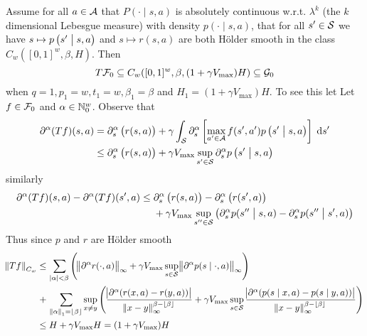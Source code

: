\begin{example}
  Assume for all $a \in \mathcal{A}$ that
  $P(\cdot \mid s,a)$ is absolutely continuous w.r.t. $\lambda^k$
  (the $k$ dimensional Lebesgue measure)
  with density $p(\cdot \mid s, a)$,
  that for all $s' \in \mathcal{S}$ we have
  $s \mapsto p\left(s' \;\middle\vert\; s, a \right)$
  and $s \mapsto r(s, a)$ are both Hölder smooth in the class
  $C_w([0,1]^w, \beta, H)$.
  Then
  \[ T \mathcal{F}_0 \subseteq C_w([0,1]^w, \beta, (1 + \gamma V_{\max}) H)
  \subseteq \mathcal{G}_0 \] 
  when $q=1, p_1 = w, t_1 = w, \beta_1 = \beta$ and $H_1 =
  (1 + \gamma V_{\max}) H$.
  To see this let
  Let $f \in \mathcal{F}_0$ and $\alpha \in \mathbb{N}_0^w$.
  Observe that
  \begin{align*}
    \partial^\alpha (Tf)(s, a)
    = & \; \partial^\alpha_s \left( r(s, a) \right)
    + \gamma \int_{\mathcal{S}}\partial^\alpha_s \left[ \max_{a' \in \mathcal{A}}
    f(s', a') p\left(s' \;\middle\vert\; s, a\right) \right] \; \mathrm{d} s' 
    \\ \leq & \; \partial^\alpha_s \left( r(s, a) \right)
    + \gamma V_{\max} \sup_{s' \in \mathcal{S}} \partial_s^\alpha
    p\left(s' \;\middle\vert\; s, a\right)
  \end{align*}
  similarly
  \begin{align*}
    \partial^\alpha (Tf)(s, a) - \partial^\alpha (Tf)(s', a)
    \leq & \; \partial^\alpha_s \left( r(s, a) \right)
    - \partial^\alpha_s \left( r(s', a) \right)
    \\ & \; + \gamma V_{\max} \sup_{s'' \in \mathcal{S}}
    \left( \partial_s^\alpha p(s'' \;\middle\vert\; s, a)
    - \partial_s^\alpha p(s'' \;\middle\vert\; s', a) \right)
  \end{align*}
  Thus since $p$ and $r$ are Hölder smooth
  \begin{align*}
    \norm{Tf}_{C_w} \leq & \; \sum_{\abs{\alpha}<\beta} \left(
      \norm{\partial^\alpha r(\cdot, a)}_\infty
      + \gamma V_{\max} \sup_{s \in \mathcal{S}} \norm{\partial^\alpha
    p(s \mid \cdot, a)}_\infty \right)
    \\ + & \; \sum_{\norm{\alpha}_1 = \lfloor\beta\rfloor} \sup_{x \neq y}
    \left(
      \frac{\abs{\partial^\alpha (r(x, a) - r(y, a))}}
      {\norm{x - y}_{\infty}^{\beta - \lfloor\beta\rfloor}}
      + \gamma V_{\max} \sup_{s \in \mathcal{S}} \frac{
      \abs{\partial^\alpha (p(s \mid x, a) - p(s \mid y, a))}}
      {\norm{x - y}_{\infty}^{\beta - \lfloor\beta\rfloor}}
    \right)
    \\ \leq & \; H + \gamma V_{\max} H = (1 + \gamma V_{\max}) H
  \end{align*}
  
\end{example}

